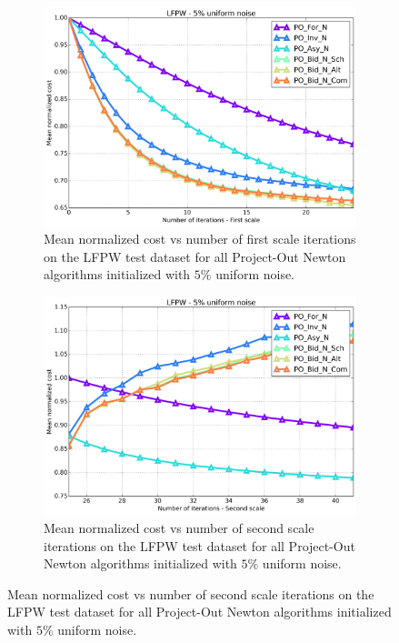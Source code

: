 \begin{figure}[p]
	\par\bigskip\bigskip
	\begin{subfigure}{0.48\textwidth}
	    \includegraphics[width=\textwidth]{experiments/algorithms/po_n/mean_cost_vs_iters1_po_n_5.png}
	    \caption{Mean normalized cost vs number of first scale iterations on the LFPW test dataset for all Project-Out Newton algorithms initialized with $5\%$ uniform noise.}
	    \label{fig:mean_cost_vs_iters1_po_n_5}
	\end{subfigure}
	\hfill
	\begin{subfigure}{0.48\textwidth}
	    \includegraphics[width=\textwidth]{experiments/algorithms/po_n/mean_cost_vs_iters2_po_n_5.png}
	    \caption{Mean normalized cost vs number of second scale iterations on the LFPW test dataset for all Project-Out Newton algorithms initialized with $5\%$ uniform noise.}

\end{subfigure}
\end{figure}
